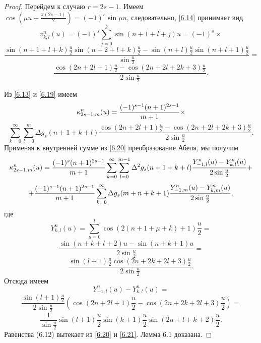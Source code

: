 \begin{proof}
Перейдем к случаю $r=2s-1$. Имеем $\cos(\mu u+\frac{\pi (2s-1)}{2})=(-1)^s\sin\mu u$, следовательно, \eqref{6.14} принимает вид
$$
v^n_{k,l}(u)=(-1)^s\sum\limits_{j=0}^k\sin(n+1+l+j)u=(-1)^s\times
$$
$$
    \frac{\sin(n+1+l+k)\frac u2\sin(n+2+l+k)\frac u2-\sin(n+l)\frac u2\sin(n+l+1)\frac u2} {\sin\frac u2}=
$$
\begin{equation}\label{6.19}
    \frac{\cos(2n+2l+1)\frac u2-\cos(2n+2l+2k+3)\frac u2} {2\sin\frac u2}.
\end{equation}


Из \eqref{6.13} и \eqref{6.19} имеем
$$
\kappa_{2s-1,m}^n(u)={(-1)^{s-1}(n+1)^{2s-1}\over m+1}\times
$$
\begin{equation}\label{6.20}
    \sum\limits_{k=0}^\infty\sum\limits_{l=0}^m \Delta
g_s(n+1+k+l) \frac{\cos(2n+2l+1)\frac u2-\cos(2n+2l+2k+3)\frac u2} {2\sin\frac u2}.
\end{equation}
Применяя к внутренней сумме из \eqref{6.20} преобразование Абеля, мы получим
$$
\kappa_{2s-1,m}^n(u)={(-1)^{s}(n+1)^{2s-1}\over m+1}\sum\limits_{k=0}^\infty
\sum\limits_{l=0}^{m-1}\Delta^2 g_s(n+1+k+l)\frac{Y^n_{-1,l}(u)-Y^n_{k,l}(u)}{2\sin\frac u2}+
$$
$$+{(-1)^{s-1}(n+1)^{2s-1}\over m+1}\sum\limits_{k=0}^\infty\Delta g_s(m+n+k+1)
\frac{Y^n_{-1,m}(u)-Y^n_{k,m}(u)}{2\sin\frac u2},
$$
где
$$Y^n_{k,l}(u)=\sum\limits_{\mu=0}^l\cos(2(n+1+\mu+k)+1)\frac u2=
$$
$$
\frac{\sin(n+k+l+2)u-\sin(n+k+1)u}{2\sin\frac u2}=
$$
$$
\frac{\sin(l+1)\frac{u}{2}\cos(2n+2k+2l+3)\frac{u}{2}}{2\sin\frac u2}.
$$
Отсюда имеем
$$
Y_{-1,l}^n(u)-Y_{k,l}^n(u)=
$$
$$
\frac{\sin(l+1)\frac{u}{2}}{2\sin\frac u2}(\cos(2n+2l+1)\frac{u}{2}-\cos(2n+2k+2l+3)\frac{u}{2})=
$$
\begin{equation}\label{6.21}
  \frac{1}{\sin\frac u2}\sin(l+1)\frac{u}{2}\sin(k+1)\frac{u}{2}
\sin(2n+l+k+2)\frac{u}{2}.
\end{equation}
Равенства (6.12) вытекает из \eqref{6.20} и \eqref{6.21}. Лемма 6.1 доказана.


 \end{proof}


